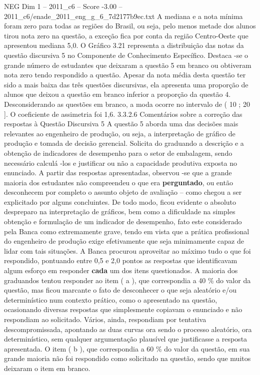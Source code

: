 \begin{textsample}{NEG Dim 1 – 2011\_c6 – Score -3.00 – 2011\_c6/enade\_2011\_eng\_g\_6\_7d2177b9ec.txt}
A mediana e a nota mínima foram zero para todas as regiões do Brasil, ou seja, pelo menos metade dos alunos tirou nota zero na questão, a exceção fica por conta da região Centro-Oeste que apresentou mediana 5,0.
O Gráfico 3.21 representa a distribuição das notas da questão discursiva 5 no Componente de Conhecimento Específico.
Destaca -se o grande número de estudantes que deixaram a questão 5 em branco ou obtiveram nota zero tendo respondido a questão.
Apesar da nota média desta questão ter sido a mais baixa das três questões discursivas, ela apresenta uma proporção de alunos que deixou a questão em branco inferior a proporção da questão 4.
Desconsiderando as questões em branco, a moda ocorre no intervalo de ( 10 ; 20 ].
O coeficiente de assimetria foi 1,6. 3.3.2.6 Comentários sobre a correção das respostas à Questão Discursiva 5 A questão 5 aborda uma das decisões mais relevantes ao engenheiro de produção, ou seja, a interpretação de gráfico de produção e tomada de decisão gerencial.
Solicita do graduando a descrição e a obtenção de indicadores de desempenho para o setor de embalagem, sendo necessário calculá -los e justificar ou não a capacidade produtiva exposta no enunciado.
A partir das respostas apresentadas, observou -se que a grande maioria dos estudantes não compreendeu o que era \textbf{perguntado}, ou então desconhecem por completo o assunto objeto de avaliação – como chegou a ser explicitado por alguns concluintes.
De todo modo, ficou evidente o absoluto despreparo na interpretação de gráficos, bem como a dificuldade na simples obtenção e formulação de um indicador de desempenho, fato este considerado pela Banca como extremamente grave, tendo em vista que a prática profissional do engenheiro de produção exige efetivamente que seja minimamente capaz de lidar com tais situações.
A Banca procurou aproveitar ao máximo tudo o que foi respondido, pontuando entre 0,5 e 2,0 pontos as respostas que identificavam algum esforço em responder \textbf{cada} um dos itens questionados.
A maioria dos graduandos tentou responder ao item ( a ), que correspondia a 40 \% do valor da questão, mas ficou marcante o fato de desconhecer o que seja aleatório e/ou determinístico num contexto prático, como o apresentado na questão, ocasionando diversas respostas que simplesmente copiavam o enunciado e não respondiam ao solicitado.
Vários, ainda, respondiam por tentativa descompromissada, apontando as duas curvas ora sendo o processo aleatório, ora determinístico, sem qualquer argumentação plausível que justificasse a resposta apresentada.
O item ( b ), que correspondia a 60 \% do valor da questão, em sua grande maioria não foi respondido como solicitado na questão, sendo que muitos deixaram o item em branco.

\end{textsample}

